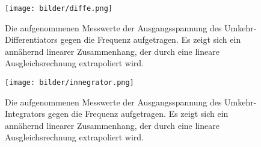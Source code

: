 \begin{figure}[h]
  \centering
  \texttt{[image: bilder/diffe.png]}
  \caption{Die aufgenommenen Messwerte der Ausgangsspannung des Umkehr-Differentiators gegen die Frequenz aufgetragen. Es zeigt sich ein annähernd linearer Zusammenhang, der durch eine lineare Ausgleichsrechnung extrapoliert wird.}
\end{figure}
\begin{figure}[h]
  \centering
  \texttt{[image: bilder/innegrator.png]}
  \caption{Die aufgenommenen Messwerte der Ausgangsspannung des Umkehr-Integrators gegen die Frequenz aufgetragen. Es zeigt sich ein annähernd linearer Zusammenhang, der durch eine lineare Ausgleichsrechnung extrapoliert wird.}
\end{figure}

